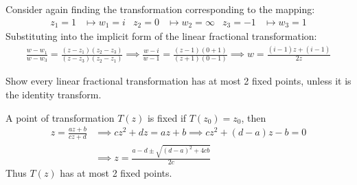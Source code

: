 \documentclass[12pt, english]{book}
\makeatletter
\renewenvironment{proof}[1][\proofname]{\par
	\pushQED{\qed}%
	\normalfont \topsep6\p@\@plus6\p@\relax
	\list{}{%
		\settowidth{\leftmargin}{\itshape\proofname:\hskip\labelsep}%
		\setlength{\labelwidth}{0pt}%
		\setlength{\itemindent}{-\leftmargin}%
	}%
	\item[\hskip\labelsep\itshape#1\@addpunct{:}]\ignorespaces
	}{ \popQED\endlist\@endpefalse}
\makeatother
\begin{document}
	\begin{example}
		Consider again finding the transformation corresponding to the mapping:
		\begin{align*}
			z_1 = 1 &\mapsto w_1 = i &
			z_2 = 0 &\mapsto w_2 = \infty &
			z_3 = -1 &\mapsto w_3 = 1
		\end{align*}
		Substituting into the implicit form of the linear fractional transformation:
		\begin{align*}
			\frac{w - w_1}{w - w_3} = \frac{(z-z_1)(z_2 - z_3)}{(z - z_3)(z_2 - z_1)}
			\implies \frac{w - i}{w - 1} = \frac{(z - 1)(0 + 1)}{(z + 1)(0 - 1)}
			\implies w = \frac{(i-1)z + (i - 1)}{2z}
		\end{align*}
	\end{example}

	\begin{example}Show every linear fractional transformation has at most 2 fixed points, unless it is the identity transform.
		\label{Linear Fractional Transformation has at most 2 fixed points Example - Complex}
		
		\begin{proof}
		{\color{Grey}
		A point of transformation \(T(z)\) is fixed if \(T(z_0) = z_0\), then 
		\begin{align*}
			z = \frac{az + b}{cz + d} 
			&\implies cz^2 + dz = az + b \implies cz^2 + (d - a)z - b = 0 \\
			&\implies z = \frac{a - d \pm \sqrt{(d-a)^2 + 4cb}}{2c}
		\end{align*}
		Thus \(T(z)\) has at most 2 fixed points.}
		\end{proof}
	\end{example}
	
\end{document}
